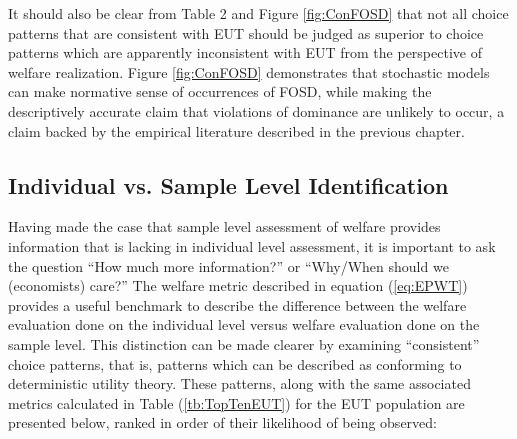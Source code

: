 \documentclass[../main.tex]{subfiles}
\begin{document}
It should also be clear from Table 2 and Figure \ref{fig:ConFOSD} that not all choice patterns that are consistent with EUT should be judged as superior to choice patterns which are apparently inconsistent with EUT from the perspective of welfare realization.
Figure \ref{fig:ConFOSD} demonstrates that stochastic models can make normative sense of occurrences of FOSD, while making the descriptively accurate claim that violations of dominance are unlikely to occur, a claim backed by the empirical literature described in the previous chapter.

\subsection{Individual vs. Sample Level Identification}

Having made the case that sample level assessment of welfare provides information that is lacking in individual level assessment, it is important to ask the question \enquote{How much more information?} or \enquote{Why/When should we (economists) care?} 
The welfare metric described in equation (\ref{eq:EPWT}) provides a useful benchmark to describe the difference between the welfare evaluation done on the individual level versus welfare evaluation done on the sample level.
This distinction can be made clearer by examining \enquote{consistent} choice patterns, that is, patterns which can be described as conforming to deterministic utility theory.
These patterns, along with the same associated metrics calculated in Table (\ref{tb:TopTenEUT}) for the EUT population are presented below, ranked in order of their likelihood of being observed:
\end{document}
